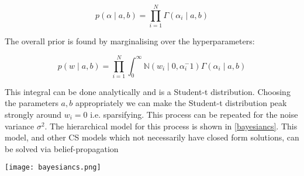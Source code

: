 \begin{equation}
p\left(\alpha \mid a, b \right) = \prod_{i=1}^{N} \Gamma\left( \alpha_i \mid a, b \right)
\end{equation}

The overall prior is found by marginalising over the hyperparameters:

\begin{equation}
p\left( w \mid a, b \right) = \prod_{i=1}^{N} \int_{0}^{\infty} \mathbb{N}\left(w_i\mid 0, \alpha_{i}^-1\right) \Gamma\left( \alpha_i \mid a, b \right)
\end{equation}

This integral can be done analytically and is a Student-t distribution. Choosing the parameters \(a,b\) appropriately we can make the Student-t distribution peak strongly around \(w_i = 0\) i.e. sparsifying. This process can be repeated for the noise variance \(\sigma^2\). The hierarchical model for this process is shown in \ref{bayesiancs}. This model, and other CS models which not necessarily have closed form solutions, can be solved via belief-propagation \cite{Baron2010}

\begin{figure*}[h]
\centering
\texttt{[image: bayesiancs.png]}
\caption{The hierarchical model for the Bayesian CS formulation \cite{Ji2008}}
\label{bayesiancs}
\end{figure*}